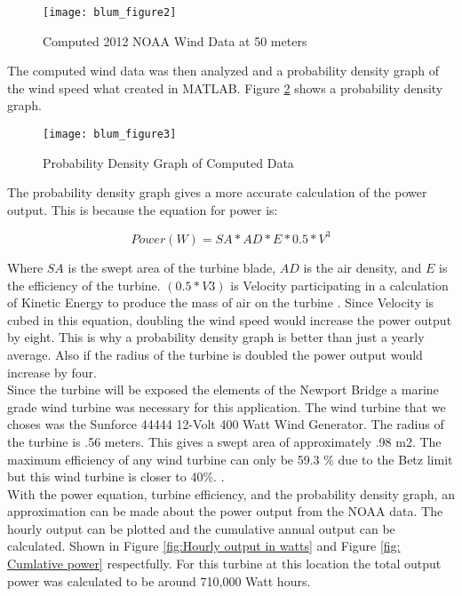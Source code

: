 \begin{figure}
\centering
\texttt{[image: blum\_figure2]}
\caption{Computed 2012 NOAA Wind Data at 50 meters}
\label{fig:new_computed_wind_data}
\end{figure}


The computed wind data was then analyzed and a probability density graph of the wind speed what created in MATLAB. Figure \ref{fig:Probality_density_function} shows a probability density graph.



\begin{figure}
\centering
\texttt{[image: blum\_figure3]}
\caption{Probability Density Graph of Computed Data}
\label{fig:Probality_density_function}
\end{figure}

The probability density graph gives a more accurate calculation of the power output. This is because the equation for power is: 

\begin{equation}
Power(W)={SA}*{AD}*{E}*{0.5}*{V^3}
\end{equation}

Where $SA$ is the swept area of the turbine blade, $AD$ is the air density, and $E$ is the efficiency of the turbine. $(0.5 * V3)$ is Velocity participating in a calculation of Kinetic Energy to produce the mass of air on the turbine \cite{ArcGIS2012}. Since Velocity is cubed in this equation, doubling the wind speed would increase the power output by eight. This is why a probability density graph is better than just a yearly average.  Also if the radius of the turbine is doubled the power output would increase by four.\\
\indent
Since the turbine will be exposed the elements of the Newport Bridge a marine grade wind turbine was necessary for this application. The wind turbine that we choses was the Sunforce 44444 12-Volt 400 Watt Wind Generator. The radius of the turbine is .56 meters. This gives a swept area of approximately .98 m2. The maximum efficiency of any wind turbine can only be 59.3 \% due to the Betz limit but this wind turbine is closer to 40\%. \cite{Windpower2008}.\\
\indent   
With the power equation, turbine efficiency, and the probability density graph, an approximation can be made about the power output from the NOAA data. The hourly output can be plotted and the cumulative annual output can be calculated. Shown in Figure \ref{fig:Hourly output in watts} and Figure \ref{fig: Cumlative power} respectfully. For this turbine at this location the total output power was calculated to be around 710,000 Watt hours. \\
\indent

